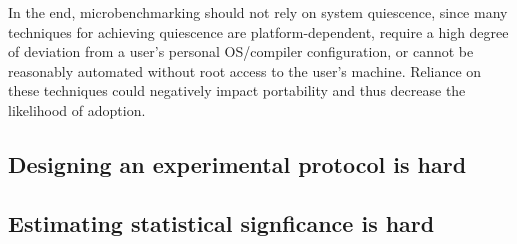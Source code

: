 \documentclass[conference]{IEEEtran}
\begin{document}

In the end, microbenchmarking should not rely on system quiescence, since many techniques
for achieving quiescence are platform-dependent, require a high degree of deviation from
a user's personal OS/compiler configuration, or cannot be reasonably automated without
root access to the user's machine. Reliance on these techniques could negatively impact
portability and thus decrease the likelihood of adoption.

\subsection{Designing an experimental protocol is hard}


\subsection{Estimating statistical signficance is hard}
\end{document}
